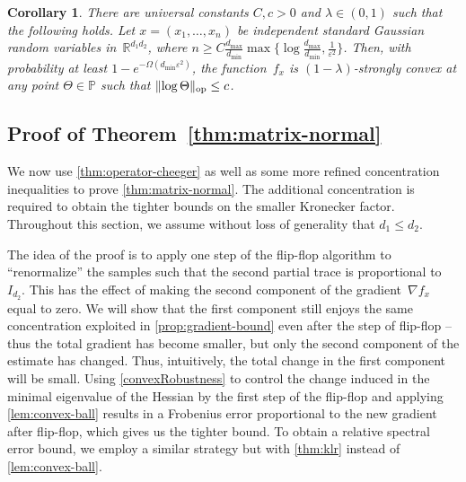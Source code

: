 \documentclass[aos]{imsart}
\newtheorem{corollary}[theorem]{Corollary}
\theoremstyle{definition}
\numberwithin{equation}{section}
\DeclareMathOperator{\op}{op}
\DeclarePairedDelimiter{\norm}{\lVert}{\rVert}
\newcommand{\R}{{\mathbb{R}}}
\renewcommand{\P}{{\mathbb{P}}}
\newcommand{\eps}{\varepsilon}
\newcommand{\samp}{x}
\def\dmax{d_{\max}}
\newcommand{\AR}[1]{{\color{orange}[AR: #1]}}
\newcommand{\AR}[1]{{}}
\begin{document}
\begin{corollary}\label{cor:matrix-convexity}
There are universal constants $C, c > 0$ and $\lambda\in(0,1)$ such that the following holds.
Let $x=(x_1,\dots,x_n)$ be independent standard Gaussian random variables in~$\R^{d_1d_2}$, where $n \geq C \frac{\dmax}{d_{\min}} \max\{\log \frac{\dmax}{d_{\min}}, \frac1{\eps^2} \}$.
Then, with probability at least $1 - e^{ - \Omega( d_{\min} \eps^2)}$, the function~$f_x$ is $(1-\lambda)$-strongly convex at any point $\Theta\in\P$ such that $\norm{\log\Theta}_{\op} \leq c$.
\end{corollary}



\subsection{Proof of Theorem~\ref{thm:matrix-normal}}
We now use \cref{thm:operator-cheeger} as well as some more refined concentration inequalities to prove \cref{thm:matrix-normal}.
The additional concentration is required to obtain the tighter bounds on the smaller Kronecker factor.
Throughout this section, we assume without loss of generality that $d_1 \leq d_2$.

The idea of the proof is to apply one step of the flip-flop algorithm to ``renormalize'' the samples such that the second partial trace is proportional to $I_{d_2}$.
This has the effect of making the second component of the gradient~$\nabla f_\samp$ equal to zero.
We will show that the first component still enjoys the same concentration exploited in \cref{prop:gradient-bound} even after the step of flip-flop -- thus the total gradient has become smaller, but only the second component of the estimate has changed.
Thus, intuitively, the total change in the first component will be small.
Using \cref{convexRobustness} to control the change induced in the minimal eigenvalue of the Hessian by the first step of the flip-flop and applying \cref{lem:convex-ball} results in a Frobenius error proportional to the new gradient after flip-flop, which gives us the tighter bound.
To obtain a relative spectral error bound, we employ a similar strategy but with \cref{thm:klr} instead of \cref{lem:convex-ball}.
\end{document}
